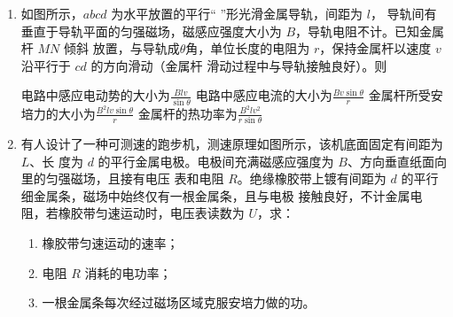\begin{enumerate}
\item
{}
如图所示，$ abcd $ 为水平放置的平行“ \hlinepicture{} ”形光滑金属导轨，间距为 $ l $，
导轨间有垂直于导轨平面的匀强磁场，磁感应强度大小为 $ B $，导轨电阻不计。已知金属杆 $ MN $ 倾斜
放置，与导轨成$ \theta $角，单位长度的电阻为 $ r $，保持金属杆以速度 $ v $ 沿平行于 $ cd $ 的方向滑动（金属杆
滑动过程中与导轨接触良好）。则  
\begin{figure}[h!]
\centering

\end{figure}

\fourchoices
{电路中感应电动势的大小为$\frac{B l v}{\sin \theta}$}
{电路中感应电流的大小为$\frac{B v \sin \theta}{r}$}
{金属杆所受安培力的大小为$\frac{B^{2} l v \sin \theta}{r}$}
{金属杆的热功率为$\frac{B^{2} l v^{2}}{r \sin \theta}$}

\item 
{}
有人设计了一种可测速的跑步机，测速原理如图所示，该机底面固定有间距为 $ L $、长
度为 $ d $ 的平行金属电极。电极间充满磁感应强度为 $ B $、方向垂直纸面向里的匀强磁场，且接有电压
表和电阻 $ R $。绝缘橡胶带上镀有间距为 $ d $ 的平行细金属条，磁场中始终仅有一根金属条，且与电极
接触良好，不计金属电阻，若橡胶带匀速运动时，电压表读数为 $ U $，求：
\begin{enumerate}
\item
橡胶带匀速运动的速率；



\item 
电阻 $ R $ 消耗的电功率；


\item 
一根金属条每次经过磁场区域克服安培力做的功。

\end{enumerate}
\begin{figure}[h!]
\flushright

\end{figure}



\end{enumerate}
